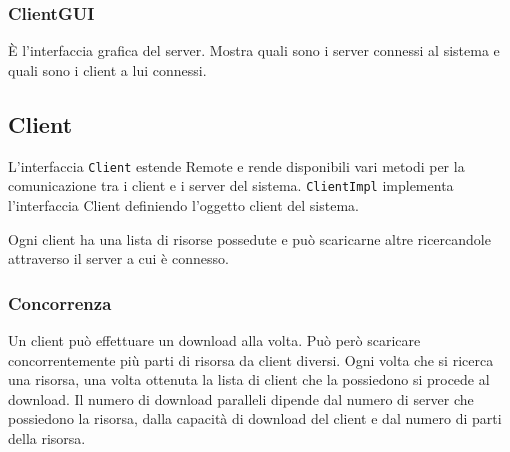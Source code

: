 \documentclass[10pt]{article}
\begin{document}
\subsubsection{ClientGUI}
È l'interfaccia grafica del server. Mostra quali sono i server connessi al sistema e quali sono i client a lui connessi.

\subsection{Client}
L'interfaccia {\verb!Client!} estende Remote e rende disponibili vari metodi per la comunicazione tra i client e i server del sistema.
{\verb!ClientImpl!} implementa l'interfaccia Client definiendo l'oggetto client del sistema.

Ogni client ha una lista di risorse possedute e può scaricarne altre ricercandole attraverso il server a cui è connesso.

\subsubsection{Concorrenza}
Un client può effettuare un download alla volta. Può però scaricare concorrentemente più parti di risorsa da client diversi.
Ogni volta che si ricerca una risorsa, una volta ottenuta la lista di client che la possiedono si procede al download.
Il numero di download paralleli dipende dal numero di server che possiedono la risorsa, dalla capacità di download del client e dal numero di parti della risorsa.
\end{document}

